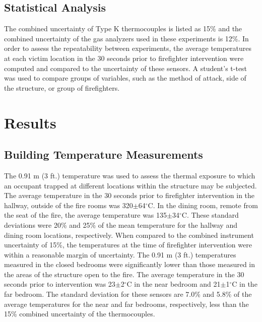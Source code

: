 \documentclass[12pt,oneside]{article}
\begin{document}
\subsection{Statistical Analysis}

The combined uncertainty of Type K thermocouples is listed as 15\% \cite{Blevins:1999,Pitts_etal_TC} and the combined uncertainty of the gas analyzers used in these experiments is 12\%. In order to assess the repeatability between experiments, the average temperatures at each victim location in the 30 seconds prior to firefighter intervention were computed and compared to the uncertainty of these sensors. A student's t-test was used to compare groups of variables, such as the method of attack, side of the structure, or group of firefighters. 

\section{Results}

\subsection{Building Temperature Measurements}
\label{subsec:temps}
The 0.91 m (3 ft.) temperature was used to assess the thermal exposure to which an occupant trapped at different locations within the structure may be subjected. The average temperature in the 30 seconds prior to firefighter intervention in the hallway, outside of the fire rooms was 320$\pm$64$^{\circ}$C. In the dining room, remote from the seat of the fire, the average temperature was 135$\pm$34$^{\circ}$C. These standard deviations were 20\% and 25\% of the mean temperature for the hallway and dining room locations, respectively. When compared to the combined instrument uncertainty of 15\%, the temperatures at the time of firefighter intervention were within a reasonable margin of uncertainty. The 0.91 m (3 ft.) temperatures measured in the closed bedrooms were significantly lower than those measured in the areas of the structure open to the fire. The average temperature in the 30 seconds prior to intervention was 23$\pm$2$^{\circ}$C in the near bedroom and 21$\pm$1$^{\circ}$C in the far bedroom. The standard deviation for these sensors are 7.0\% and 5.8\% of the average temperatures for the near and far bedrooms, respectively, less than the 15\% combined uncertainty of the thermocouples.
\end{document}
